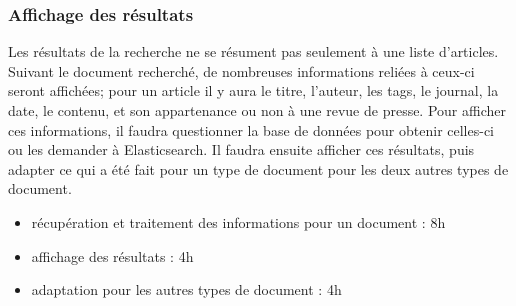 	\subsubsection{Affichage des résultats} 
	\label{subsubsec:rech_result}
		Les résultats de la recherche ne se résument pas seulement à une liste d'articles. Suivant le document recherché, de nombreuses informations reliées à ceux-ci seront affichées; pour un article il y aura le titre, l'auteur, les tags, le journal, la date, le contenu, et son appartenance ou non à une revue de presse. Pour afficher ces informations, il faudra questionner la base de données pour obtenir celles-ci ou les demander à Elasticsearch. Il faudra ensuite afficher ces résultats, puis adapter ce qui a été fait pour un type de document pour les deux autres types de document.

		\begin{itemize}
			\item récupération et traitement des informations pour un document : 8h
			\item affichage des résultats : 4h
			\item adaptation pour les autres types de document : 4h
		\end{itemize}

